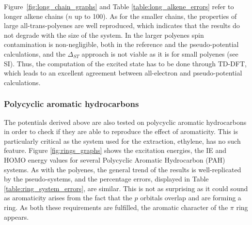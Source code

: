 \documentclass[12pt]{article}
\begin{document}
Figure~\ref{fig:long_chain_graphs} and Table \ref{table:long_alkene_errors} refer to longer 
alkene chains (\(n\) up to 100).
As for the smaller chains, the properties of large all-trans-polyenes are well reproduced,
which indicates that the results do not degrade with the size of the system.
In the larger polyenes spin contamination is non-negligible, both in the reference and the pseudo-potential calculations, and the $\Delta_{ST}$ approach is not viable as it is for small polyenes (see SI).
Thus, the computation of the excited state has to be done through TD-DFT, which leads to an excellent agreement between all-electron and pseudo-potential calculations.

\subsubsection*{\sffamily \large Polycyclic aromatic hydrocarbons}

The potentials derived above are also tested on polycyclic aromatic hydrocarbons
in order to check if they are able to reproduce the effect of aromaticity.
This is particularly critical as the system used for the extraction, ethylene, has no such feature.
Figure \ref{fig:rings_graphs} shows the excitation energies, the IE and
HOMO energy values for several Polycyclic Aromatic Hydrocarbon (PAH) systems.
As with the polyenes, the general trend of the results is well-replicated
by the pseudo-systems, and the percentage errors, displayed in Table
\ref{table:ring_system_errors}, are similar.
This is not as surprising as it could sound as aromaticity arises from the fact that
the $p$ orbitals overlap and are forming a ring.
As both these requirements are fulfilled, the aromatic character of the $\pi$ ring
appears.

%
%
\end{document}
